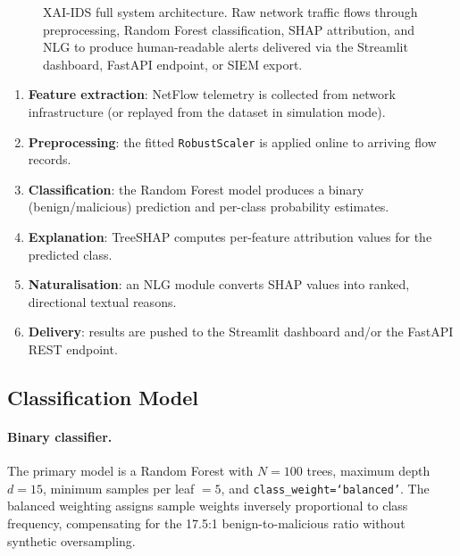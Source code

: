 \documentclass[12pt,a4paper]{article}
\begin{document}
\begin{figure}[h!]
{}
\caption{XAI-IDS full system architecture. Raw network traffic flows through
preprocessing, Random Forest classification, SHAP attribution, and NLG to produce
human-readable alerts delivered via the Streamlit dashboard, FastAPI endpoint,
or SIEM export.}
\label{fig:arch_system}
\end{figure}

\begin{enumerate}
  \item \textbf{Feature extraction}: NetFlow telemetry is collected from network
        infrastructure (or replayed from the dataset in simulation mode).
  \item \textbf{Preprocessing}: the fitted \texttt{RobustScaler} is applied
        online to arriving flow records.
  \item \textbf{Classification}: the Random Forest model produces a binary
        (benign/malicious) prediction and per-class probability estimates.
  \item \textbf{Explanation}: TreeSHAP computes per-feature attribution values
        for the predicted class.
  \item \textbf{Naturalisation}: an NLG module converts SHAP values into ranked,
        directional textual reasons.
  \item \textbf{Delivery}: results are pushed to the Streamlit dashboard and/or
        the FastAPI REST endpoint.
\end{enumerate}

\subsection{Classification Model}

\paragraph{Binary classifier.}
The primary model is a Random Forest \cite{breiman2001random} with
$N=100$ trees, maximum depth $d=15$, minimum samples per leaf $= 5$,
and \texttt{class\_weight=`balanced'}. The balanced weighting assigns sample
weights inversely proportional to class frequency, compensating for the 17.5:1
benign-to-malicious ratio without synthetic oversampling.
\end{document}
